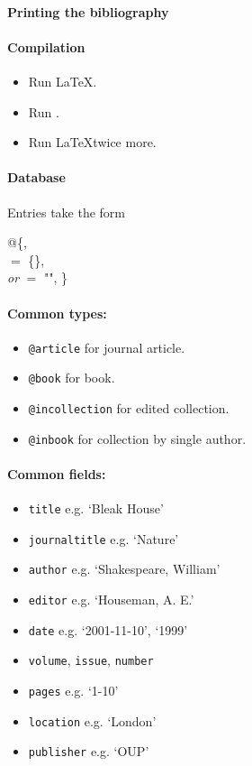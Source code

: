 \paragraph{Printing the bibliography}
\begin{pseudoverb}
\end{pseudoverb}

\paragraph{Compilation}
\begin{itemize}
\item Run \LaTeX.
\item Run .
\item Run \LaTeX twice more.
\end{itemize}

\paragraph{Database} Entries take the form
\begin{pseudoverb}
@\{,\\
  $=$ \{\}, \\
 \emph{or}  $=$ "",
 \}
\end{pseudoverb}

\paragraph{Common types:}
\begin{itemize}
\item \texttt{@article} for journal article.
\item \texttt{@book} for book.
\item \texttt{@incollection} for edited collection.
\item \texttt{@inbook} for collection by single author.
\end{itemize}

\paragraph{Common fields:}
\begin{itemize}
\item \texttt{title} e.g. `Bleak House'
\item \texttt{journaltitle} e.g. `Nature'
\item \texttt{author} e.g. `Shakespeare, William'
\item \texttt{editor} e.g. `Houseman, A. E.'
\item \texttt{date} e.g. `2001-11-10', `1999'
\item \texttt{volume}, \texttt{issue}, \texttt{number}
\item \texttt{pages} e.g. `1-10'
\item \texttt{location} e.g. `London'
\item \texttt{publisher} e.g. `OUP'
\end{itemize}

